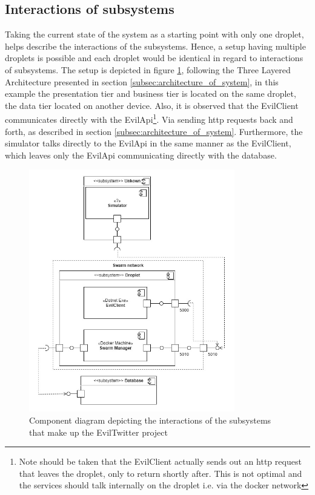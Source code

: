 \documentclass[report/main.tex]{subfiles}
\begin{document}
    
        \subsection{Interactions of subsystems}
            Taking the current state of the system as a starting point with only one droplet, helps describe the interactions of the subsystems. Hence, a setup having multiple droplets is possible and each droplet would be identical in regard to interactions of subsystems. The setup is depicted in figure \ref{fig:component-diagram}, following the Three Layered Architecture presented in section \ref{subsec:architecture_of_system}, in this example the presentation tier and business tier is located on the same droplet, the data tier located on another device. Also, it is observed that the EvilClient communicates directly with the EvilApi\footnote{Note should be taken that the EvilClient actually sends out an http request that leaves the droplet, only to return shortly after. This is not optimal and the services should talk internally on the droplet i.e. via the docker network}. Via sending http requests back and forth, as described in section \ref{subsec:architecture_of_system}. Furthermore, the simulator talks directly to the EvilApi in the same manner as the EvilClient, which leaves only the EvilApi communicating directly with the database.
    
            \begin{figure}[H]
                \centering
                \includegraphics[width=0.8\textwidth]{report/images/EvilTwitter-Component Diagram - Evil Corp.jpg}
                \caption{Component diagram depicting the interactions of the subsystems that make up the EvilTwitter project}
                \label{fig:component-diagram}
            \end{figure}
            
\end{document}
